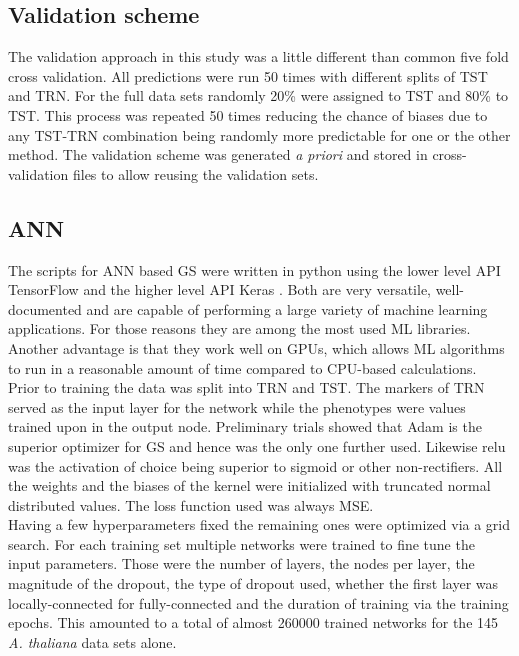 \subsection{Validation scheme} \label{cv}

The validation approach in this study was a little different than common five fold cross
validation. All predictions were run 50 times with different splits of TST and TRN. For
the full data sets randomly 20\% were assigned to TST and 80\% to TST. This process was
repeated 50 times reducing the chance of biases due to any TST-TRN combination being
randomly more predictable for one or the other method. The validation scheme was generated
\textit{a priori} and stored in cross-validation files to allow reusing the validation
sets.

\subsection{ANN}
The scripts for ANN based GS were written in python using the lower level API TensorFlow
\cite{TF2016} and the higher level API Keras \cite{keras2015}. Both are very versatile,
well-documented and are capable of performing a large variety of machine learning
applications. For those reasons they are among the most used ML libraries. Another
advantage is that they work well on GPUs, which allows ML algorithms to run in a
reasonable amount of time compared to CPU-based calculations. \\
Prior to training the data was split into TRN and TST. The markers of TRN served as the
input layer for the network while the phenotypes were values trained upon in the output
node. Preliminary trials showed that Adam is the superior optimizer for GS and hence was
the only one further used. Likewise relu was the activation of choice being superior to
sigmoid or other non-rectifiers. All the weights and the biases of the kernel were
initialized with truncated normal distributed
values. The loss function used was always MSE. \\
Having a few hyperparameters fixed the remaining ones were optimized via a grid
search. For each training set multiple networks were trained to fine tune the input
parameters. Those were the number of layers, the nodes per layer, the magnitude of the
dropout, the type of dropout used, whether the first layer was locally-connected for
fully-connected and the duration of training via the training epochs. This amounted to a
total of almost 260000 trained networks for the 145 \textit{A. thaliana} data sets alone. \\
